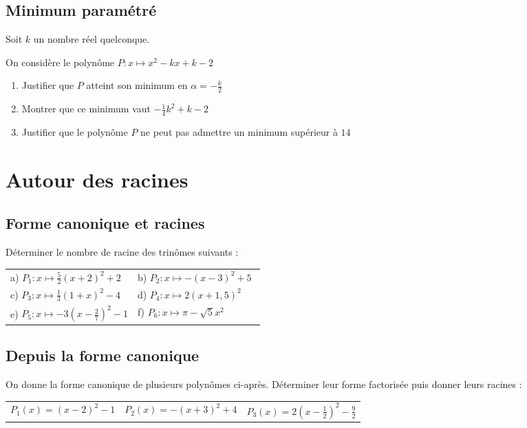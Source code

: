 \documentclass[oneside,12pt]{article}          %
\begin{document}
\subsection{Minimum paramétré}
Soit $k$ un nombre réel quelconque. 

On considère le polynôme $P:x\mapsto x^2-kx+k-2$
\begin{enumerate}
	\item Justifier que $P$ atteint son minimum en $\alpha=-\frac{k}{2}$
	\item Montrer que ce minimum vaut $-\frac{1}{4}k^2+k-2$
	\item Justifier que le polynôme $P$ ne peut pas admettre un minimum supérieur à $14$
\end{enumerate}



\section{Autour des racines}

\subsection{Forme canonique et racines}
Déterminer le nombre de racine des trinômes suivants :

\renewcommand{\arraystretch}{1.5}
\begin{tabular}{p{0.5\linewidth} p{0.5\linewidth}}
    a) $P_1:x\mapsto \frac{5}{2}(x+2)^{2} +2 $ &
    b) $P_2:x\mapsto -(x-3)^{2} +5 $ \\
    c) $P_3:x\mapsto \frac{1}{3}(1+x)^{2} -4 $ &
    d) $P_4:x\mapsto 2(x+1,5)^{2} $ \\
    e) $P_5:x\mapsto -3(x-\frac{2}{7})^{2} -1 $ &
    f) $P_6:x\mapsto \pi - \sqrt{5}x^2$
\end{tabular}



\subsection{Depuis la forme canonique}
On donne la forme canonique de plusieurs polynômes ci-après. Déterminer leur forme factorisée puis donner leurs racines :

\begin{tabular}{p{} p{} p{} }
    $P_1(x) = (x-2)^2-1$ & $P_2(x) = -(x+3)^2+4$ & $P_3(x)=2(x-\frac{1}{2})^2-\frac{9}{2}$
\end{tabular}
\end{document}
